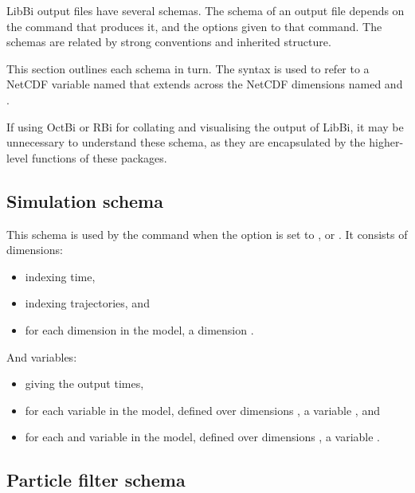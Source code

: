 LibBi output files have several schemas. The schema of an output file depends
on the command that produces it, and the options given to that command. The
schemas are related by strong conventions and inherited structure.

This section outlines each schema in turn. The syntax  is used to
refer to a NetCDF variable named  that extends across the NetCDF
dimensions named  and .

\begin{tip}
If using OctBi or RBi for collating and visualising the output of LibBi, it
may be unnecessary to understand these schema, as they are encapsulated by
the higher-level functions of these packages.
\end{tip}

\subsection{Simulation schema\label{Simulation schema}}

This schema is used by the  command when the 
option is set to ,  or . It consists
of dimensions:
\begin{itemize}
\item {} indexing time,
\item {} indexing trajectories, and
\item for each dimension  in the model, a dimension
  .
\end{itemize}
And variables:
\begin{itemize}
\item {} giving the output times,
\item for each  variable  in the model,
  defined over dimensions , a variable
  , and
\item for each  and  variable  in the
  model, defined over dimensions , a variable
  .
\end{itemize}

\subsection{Particle filter schema}

